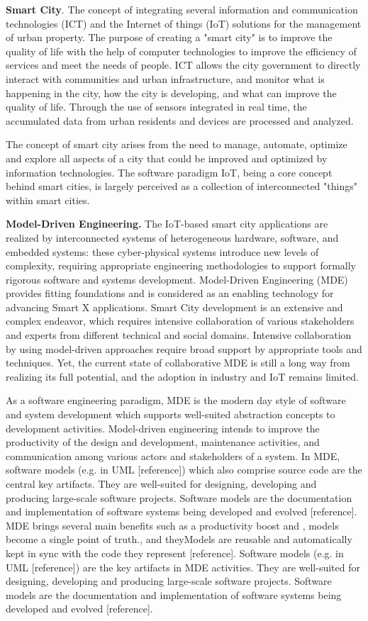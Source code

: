 \textbf{Smart City}. The concept of integrating several information and communication technologies (ICT) and the Internet of things (IoT) solutions for the management of urban property. The purpose of creating a "smart city" is to improve the quality of life with the help of computer technologies to improve the efficiency of services and meet the needs of people. ICT allows the city government to directly interact with communities and urban infrastructure, and monitor what is happening in the city, how the city is developing, and what can improve the quality of life. Through the use of sensors integrated in real time, the accumulated data from urban residents and devices are processed and analyzed. 

The concept of smart city arises from the need to manage, automate, optimize and explore all aspects of a city that could be improved and optimized by information technologies. The software paradigm IoT, being a core concept behind smart cities, is largely perceived as a collection of interconnected "things" within smart cities. 

\textbf{Model-Driven Engineering.} The IoT-based smart city applications are realized by interconnected systems of heterogeneous hardware, software, and embedded systems: these cyber-physical systems introduce new levels of complexity, requiring appropriate engineering methodologies to support formally rigorous software and systems development. Model-Driven Engineering (MDE) provides fitting foundations and is considered as an enabling technology for advancing Smart X applications. Smart City development is an extensive and complex endeavor, which requires intensive collaboration of various stakeholders and experts from different technical and social domains. Intensive collaboration by using model-driven approaches require broad support by appropriate tools and techniques. Yet, the current state of collaborative MDE is still a long way from realizing its full potential, and the adoption in industry and IoT remains limited.

As a software engineering paradigm, MDE is the modern day style of software and system development which supports well-suited abstraction concepts to development activities. Model-driven engineering intends to improve the productivity of the design and develop­ment, maintenance activities, and communication among various actors and stakeholders of a system. In MDE, software models (e.g. in UML [reference]) which also comprise source code are the central key artifacts. They are well-suited for designing, developing and producing large-scale software projects. Software models are the documentation and implementation of software systems being developed and evolved [reference]. MDE brings several main benefits such as a productivity boost and , models become a single point of truth., and theyModels are reusable and automatically kept in sync with the code they represent [reference]. Software models (e.g. in UML [reference]) are the key artifacts in MDE activities. They are well-suited for designing, developing and producing large-scale software projects. Software models are the documentation and implementation of software systems being developed and evolved [reference].

